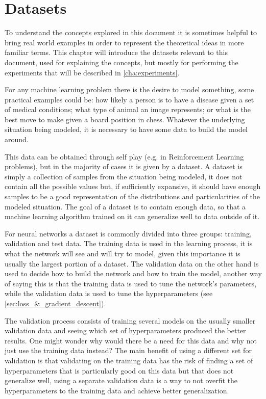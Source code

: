 \chapter{Datasets} \label{cha:datasets}
To understand the concepts explored in this document it is sometimes helpful to bring real world examples in order to represent the theoretical ideas in more familiar terms. This chapter will introduce the datasets relevant to this document, used for explaining the concepts, but mostly for performing the experiments that will be described in \autoref{cha:experiments}.

For any machine learning problem there is the desire to model something, some practical examples could be: how likely a person is to have a disease given a set of medical conditions; what type of animal an image represents; or what is the best move to make given a board position in chess. Whatever the underlying situation being modeled, it is necessary to have some data to build the model around.

This data can be obtained through self play (e.g. in Reinforcement Learning problems), but in the majority of cases it is given by a dataset. A dataset is simply a collection of samples from the situation being modeled, it does not contain all the possible values but, if sufficiently expansive, it should have enough samples to be a good representation of the distributions and particularities of the modeled situation. The goal of a dataset is to contain enough data, so that a machine learning algorithm trained on it can generalize well to data outside of it.

For neural networks a dataset is commonly divided into three groups: training, validation and test data. The training data is used in the learning process, it is what the network will see and will try to model, given this importance it is usually the largest portion of a dataset. The validation data on the other hand is used to decide how to build the network and how to train the model, another way of saying this is that the training data is used to tune the network's parameters, while the validation data is used to tune the hyperparameters (see \autoref{sec:loss_&_gradient_descent}).

The validation process consists of training several models on the usually smaller validation data and seeing which set of hyperparameters produced the better results. One might wonder why would there be a need for this data and why not just use the training data instead? The main benefit of using a different set for validation is that validating on the training data has the risk of finding a set of hyperparameters that is particularly good on this data but that does not generalize well, using a separate validation data is a way to not overfit the hyperparameters to the training data and achieve better generalization.

